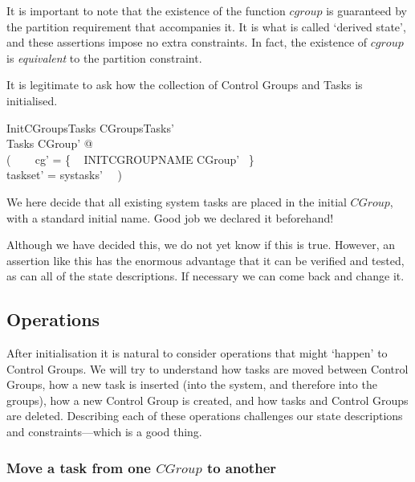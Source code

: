 \documentclass[a4paper,twoside,12pt]{article}
\begin{document}
It is important to note that the existence of the function $cgroup$ is guaranteed by the partition requirement that accompanies it. It is what is called `derived state', and these assertions impose no extra constraints. In fact, the existence of $cgroup$ is \emph{equivalent} to the partition constraint.

It is legitimate to ask how the collection of Control Groups and Tasks is initialised.

\begin{schema}{InitCGroupsTasks}
CGroupsTasks' \\
\Xi Tasks
\where
\exists CGroup' @ \\
( ~~~ cg' = \{ ~ INITCGROUPNAME \mapsto \theta CGroup' ~\} \\
\land taskset' = systasks' ~~)
\end{schema}
We here decide that all existing system tasks are placed in the initial $CGroup$, with a standard initial name. Good job we declared it beforehand!

Although we have decided this, we do not yet know if this is true. However, an assertion like this has the enormous advantage that it can be verified and tested, as can all of the state descriptions. If necessary we can come back and change it.

\subsection{Operations}

After initialisation it is natural to consider operations that might `happen' to Control Groups. We will try to understand how tasks are moved between Control Groups, how a new task is inserted (into the system, and therefore into the groups), how a new Control Group is created, and how tasks and Control Groups are deleted. Describing each of these operations challenges our state descriptions and constraints---which is a good thing.


\subsubsection{Move a task from one $CGroup$ to another}
\end{document}

